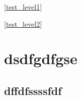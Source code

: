 

\GHz
\clock
\degreeCelsius
\ref{test_level1}

\ref{test_level2}
\section{dsdfgdfgse}

\subsection{dffdfssssfdf}



